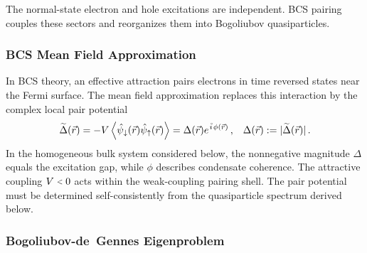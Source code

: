            The normal-state electron and hole excitations are independent. BCS pairing couples these sectors and reorganizes them into Bogoliubov quasiparticles.

        \subsubsection*{BCS Mean Field Approximation}
        \label{subsubsec:micro:bcs-mean-field}

            In BCS theory, an effective attraction pairs electrons in time reversed states near the Fermi surface. The mean field approximation replaces this interaction by the complex local pair potential
            \begin{align}
                \widetilde{\Delta}(\vec r)
                =-V\left\langle
                \hat\psi_\downarrow(\vec r)
                \hat\psi_\uparrow(\vec r)
                \right\rangle
                =\Delta(\vec r)e^{\ima\phi(\vec r)}\,,
                &&
                \Delta(\vec r):=|\widetilde{\Delta}(\vec r)|\,.
                \label{eq:micro:complex-delta}
            \end{align}
            In the homogeneous bulk system considered below, the nonnegative magnitude $\Delta$ equals the excitation gap, while $\phi$ describes condensate coherence. The attractive coupling $V\slt{}0$ acts within the weak-coupling pairing shell. The pair potential must be determined self-consistently from the quasiparticle spectrum derived below. \cite{bardeen_theory_1957}

        \subsubsection*{Bogoliubov-de~Gennes Eigenproblem}
        \label{subsubsec:micro:bdg-eigenproblem}

